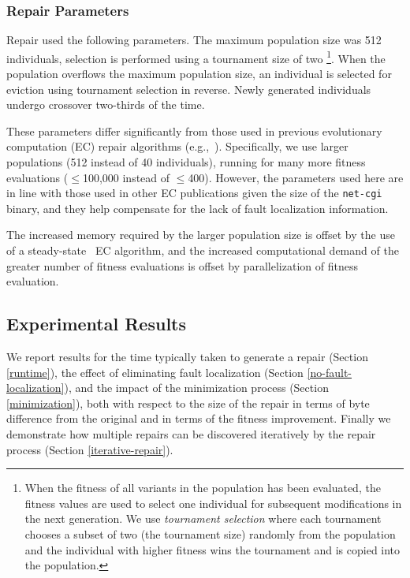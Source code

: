 \documentclass{sigcomm-alternate}
\begin{document}
\subsubsection{Repair Parameters}
\label{sec:parameters}
Repair used the following parameters.  The maximum population size was
512 individuals, selection is performed using a tournament size of two
\footnote{When the fitness of all variants in the population has been
  evaluated, the fitness values are used to select one individual for
  subsequent modifications in the next generation.  We use
  \emph{tournament selection} where each tournament chooses a subset
  of two (the tournament size) randomly from the population and the
  individual with higher fitness wins the tournament and is copied
  into the population.}.  When the population overflows the maximum
population size, an individual is selected for eviction using
tournament selection in reverse.  Newly generated individuals undergo
crossover two-thirds of the time.

These parameters differ significantly from those used in previous
evolutionary computation (EC)
repair algorithms
(e.g.,~\cite{forrest2009genetic,legoues2011systematicstudy,le2012representations}).
Specifically, we use larger populations (512 instead of 40 individuals),
running for many more fitness evaluations ($\leq$100,000 instead of
$\leq$400).  However, the parameters used here are in line with
those used in other EC publications given the size of the \texttt{net-cgi}
binary, and they
help compensate for the lack of fault localization
information.

The increased memory required by the larger population size is offset
by the use of a steady-state~\cite{Luke2013Metaheuristics} EC
algorithm, and the increased computational demand of the greater
number of fitness evaluations is offset by parallelization of fitness
evaluation.

\subsection{Experimental Results}
\label{analysis}

We report results for the time typically taken to generate a repair
(Section \ref{runtime}), the effect of eliminating fault localization
(Section \ref{no-fault-localization}), and the impact of the
minimization process (Section \ref{minimization}), both with respect
to the size of the repair in terms of byte difference from the
original and in terms of the fitness improvement.  Finally we
demonstrate how multiple repairs can be discovered iteratively by the
repair process (Section \ref{iterative-repair}).
\end{document}
